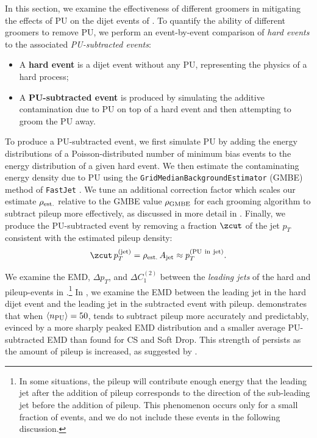 \documentclass[letterpaper,11pt]{article}
\begin{document}
In this section, we examine the effectiveness of different groomers in mitigating the effects of PU on the dijet events of .
%
To quantify the ability of different groomers to remove PU, we perform an event-by-event comparison of \textit{hard events} to the associated \textit{PU-subtracted events}:
\begin{itemize}
    \item
    A \textbf{hard event} is a dijet event without any PU, representing the physics of a hard process;

    \item
    A \textbf{PU-subtracted event} is produced by simulating the additive contamination due to PU on top of a hard event and then attempting to groom the PU away.
\end{itemize}
%
To produce a PU-subtracted event, we first simulate PU by adding the energy distributions of a Poisson-distributed number of minimum bias events to the energy distribution of a given hard event.
    We then estimate the contaminating energy density due to PU using the \texttt{GridMedianBackgroundEstimator} (GMBE) method of \texttt{FastJet} \cite{Cacciari:2011ma}.
    We tune an additional correction factor which scales our estimate \(\rho_{\rm est.}\) relative to the GMBE value \(\rho_{\rm GMBE}\) for each grooming algorithm to subtract pileup more effectively, as discussed in more detail in .
    Finally, we produce the PU-subtracted event by removing a fraction \(\zcut\) of the jet \(p_T\) consistent with the estimated pileup density:
\begin{align}
   \zcut\,p_T^{\rm(jet)}
   =
   \rho_{\rm est.}\,A_{\rm jet}
   \approx
   p_T^{\rm(PU~in~jet)}
   .
\end{align}

We examine the EMD, \(\Delta p_T\), and \(\Delta C_1^{(2)}\) between the \textit{leading jets} of the hard and pileup-events in .\footnote{
In some situations, the pileup will contribute enough energy that the leading jet after the addition of pileup corresponds to the direction of the sub-leading jet before the addition of pileup.
%
This phenomenon occurs only for a small fraction of events, and we do not include these events in the following discussion.
}
%
In , we examine the EMD between the leading jet in the hard dijet event and the leading jet in the subtracted event with pileup.
%
 demonstrates that when \(\langle n_{\rm PU} \rangle=50\),  tends to subtract pileup more accurately and predictably, evinced by a more sharply peaked EMD distribution and a smaller average PU-subtracted EMD than found for CS and Soft Drop.
%
This strength of  persists as the amount of pileup is increased, as suggested by .
\end{document}
